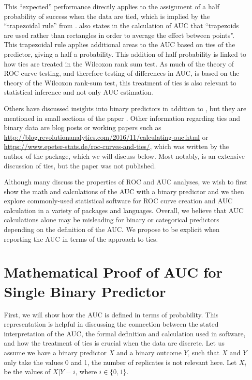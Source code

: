 \documentclass[article]{jss}
\begin{document}
This ``expected'' performance directly applies to the assignment of a
half probability of success when the data are tied, which is implied by
the ``trapezoidal rule'' from \citet{hanley1982meaning}.
\citet{fawcett2006introduction} also states in the calculation of AUC
that ``trapezoids are used rather than rectangles in order to average
the effect between points''. This trapezoidal rule applies additional
areas to the AUC based on ties of the predictor, giving a half a
probability. This addition of half probability is linked to how ties are
treated in the Wilcoxon rank sum test. As much of the theory of ROC
curve testing, and therefore testing of differences in AUC, is based on
the theory of the Wilcoxon rank-sum test, this treatment of ties is also
relevant to statistical inference and not only AUC estimation.

Others have discussed insights into binary predictors in addition to
\citet{fawcett2006introduction}, but they are mentioned in small
sections of the paper \citep{saito2015precision, pepe2009estimation}.
Other information regarding ties and binary data are blog posts or
working papers such as
\url{http://blog.revolutionanalytics.com/2016/11/calculating-auc.html}
or \url{https://www.epeter-stats.de/roc-curves-and-ties/}, which was
written by the author of the  \citep{fbroc} package, which we
will discuss below. Most notably, \citet{hsu2014inference} is an
extensive discussion of ties, but the paper was not published.

Although many discuss the properties of ROC and AUC analyses, we wish to
first show the math and calculations of the AUC with a binary predictor
and we then explore commonly-used statistical software for ROC curve
creation and AUC calculation in a variety of packages and languages.
Overall, we believe that AUC calculations alone may be misleading for
binary or categorical predictors depending on the definition of the AUC.
We propose to be explicit when reporting the AUC in terms of the
approach to ties.

\hypertarget{mathematical-proof-of-auc-for-single-binary-predictor}{%
\section{Mathematical Proof of AUC for Single Binary
Predictor}\label{mathematical-proof-of-auc-for-single-binary-predictor}}

First, we will show how the AUC is defined in terms of probability. This
representation is helpful in discussing the connection between the
stated interpretation of the AUC, the formal definition and calculation
used in software, and how the treatment of ties is crucial when the data
are discrete. Let us assume we have a binary predictor \(X\) and a
binary outcome \(Y\), such that \(X\) and \(Y\) only take the values
\(0\) and 1, the number of replicates is not relevant here. Let
\(X_{i}\) be the values of \(X | Y = i\), where \(i \in \{0, 1\}\).
\end{document}
